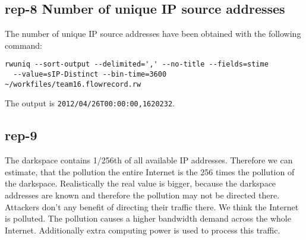 \subsection*{rep-8 Number of unique IP source addresses}
The number of unique IP source addresses have been obtained with the following command:
\begin{verbatim}
rwuniq --sort-output --delimited=',' --no-title --fields=stime
  --value=sIP-Distinct --bin-time=3600 ~/workfiles/team16.flowrecord.rw
\end{verbatim}
The output is \texttt{2012/04/26T00:00:00,1620232}.

\subsection*{rep-9}
The darkspace contains 1/256th of all available IP addresses. Therefore we can estimate, that the pollution the entire Internet is the 256 times the pollution of the darkspace. Realistically the real value is bigger, because the darkspace addresses are known and therefore the pollution may not be directed there. Attackers don't  any benefit of directing their traffic there. We think the Internet is polluted. The pollution causes a higher bandwidth demand across the whole Internet. Additionally extra computing power is used to process this traffic.
